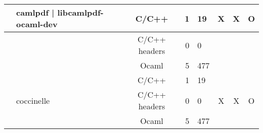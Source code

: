 \documentclass[11pt,a4paper]{article}
\begin{document}
\begin{table}[h,t]
\begin{tabular}{|>{\centering}m{3cm}| m{3cm}|c|r|m{1cm}| c| c|c|}
 & \multirow{3}{3cm}{camlpdf | libcamlpdf-ocaml-dev} & C/C++ & 1 & 19 & \multirow{3}{*}{X} & \multirow{3}{*}{X} & \multirow{3}{*}{O}\\
 \cline{3-5}
 &  &                           C/C++ headers & 0 & 0 & & & \\
 \cline{3-5}
 & &                           Ocaml & 5 & 477 & & & \\
 \cline{2-8}



 & \multirow{3}{3cm}{coccinelle} & C/C++ & 1 & 19 & \multirow{3}{*}{X} & \multirow{3}{*}{X} & \multirow{3}{*}{O}\\
 \cline{3-5}
 &  &                           C/C++ headers & 0 & 0 & & & \\
 \cline{3-5}
 & &                           Ocaml & 5 & 477 & & & \\
 \hline




\end{tabular}
\end{table}
\end{document}
